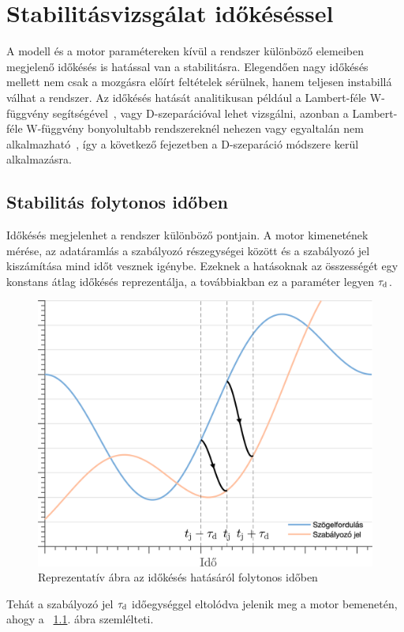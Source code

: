 \chapter{Stabilitásvizsgálat időkéséssel}\label{chap:time_delay_stability}

A modell és a motor paramétereken kívül a rendszer különböző elemeiben megjelenő időkésés 
is hatással van a stabilitásra. Elegendően nagy időkésés mellett nem csak a mozgásra előírt 
feltételek sérülnek, hanem teljesen instabillá válhat a rendszer. Az időkésés hatását analitikusan például a Lambert-féle \mbox{W-függvény} segítségével~\citep{Yi2012, MatrixLambert2007}, 
vagy \mbox{D-szeparációval} lehet vizsgálni, azonban a Lambert-féle \mbox{W-függvény} bonyolultabb rendszereknél nehezen 
vagy egyaltalán nem alkalmazható~\citep{CepedaGomez2015}, így a következő fejezetben a D-szeparáció módszere 
kerül alkalmazásra.

\section{Stabilitás folytonos időben}

Időkésés megjelenhet a rendszer különböző pontjain. A motor kimenetének mérése, az adatáramlás 
a szabályozó részegységei között és a szabályozó jel kiszámítása mind időt vesznek igénybe. 
Ezeknek a hatásoknak az összességét egy konstans átlag időkésés reprezentálja,
a továbbiakban ez a 
paraméter legyen \(\tau_{\mathrm{d}}\).
\begin{figure}[ht]
    \begin{center}
    \includegraphics[width=12cm]{images/time_delay_example.png}
    \caption{Reprezentatív ábra az időkésés hatásáról folytonos időben}\label{fig:time_delay_example}
    \end{center}
\end{figure}
Tehát a szabályozó jel \(\tau_{\mathrm{d}}\) időegységgel eltolódva jelenik meg a motor bemenetén, ahogy a
~\ref{fig:time_delay_example}. ábra szemlélteti.

